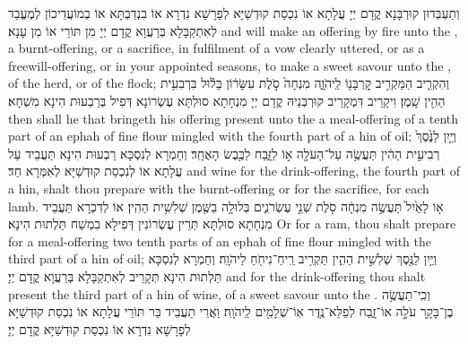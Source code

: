 {וְתַעְבְּדוּן קוּרְבָּנָא קֳדָם יְיָ עֲלָתָא אוֹ נִכְסַת קוּדְשַׁיָּא לְפָרָשָׁא נִדְרָא אוֹ בִנְדַבְתָּא אוֹ בְמוֹעֲדֵיכוֹן לְמֶעֱבַד לְאִתְקַבָּלָא בְּרַעֲוָא קֳדָם יְיָ מִן תּוֹרֵי אוֹ מִן עָנָא׃}
{and will make an offering by fire unto the \lord, a burnt-offering, or a sacrifice, in fulfilment of a vow clearly uttered, or as a freewill-offering, or in your appointed seasons, to make a sweet savour unto the \lord, of the herd, or of the flock;}{}
{וְהִקְרִ֛יב הַמַּקְרִ֥יב קׇרְבָּנ֖וֹ לַֽיהֹוָ֑ה מִנְחָה֙ סֹ֣לֶת עִשָּׂר֔וֹן בָּל֕וּל בִּרְבִעִ֥ית הַהִ֖ין שָֽׁמֶן׃
}
{וִיקָרֵיב דִּמְקָרֵיב קוּרְבְּנֵיהּ קֳדָם יְיָ מִנְחָתָא סוּלְתָּא עֶשְׂרוֹנָא דְּפִיל בְּרַבְעוּת הִינָא מִשְׁחָא׃}
{then shall he that bringeth his offering present unto the \lord\space a meal-offering of a tenth part of an ephah of fine flour mingled with the fourth part of a hin of oil;}{}
{וְיַ֤יִן לַנֶּ֙סֶךְ֙ רְבִיעִ֣ית הַהִ֔ין תַּעֲשֶׂ֥ה עַל־הָעֹלָ֖ה א֣וֹ לַזָּ֑בַח לַכֶּ֖בֶשׂ הָאֶחָֽד׃
}
{וְחַמְרָא לְנִסְכָּא רַבְעוּת הִינָא תַּעֲבֵיד עַל עֲלָתָא אוֹ לְנִכְסַת קוּדְשַׁיָּא לְאִמְּרָא חַד׃}
{and wine for the drink-offering, the fourth part of a hin, shalt thou prepare with the burnt-offering or for the sacrifice, for each lamb.}{}
{א֤וֹ לָאַ֙יִל֙ תַּעֲשֶׂ֣ה מִנְחָ֔ה סֹ֖לֶת שְׁנֵ֣י עֶשְׂרֹנִ֑ים בְּלוּלָ֥ה בַשֶּׁ֖מֶן שְׁלִשִׁ֥ית הַהִֽין׃
}
{אוֹ לְדִכְרָא תַּעֲבֵיד מִנְחָתָא סוּלְתָּא תְּרֵין עֶשְׂרוֹנִין דְּפִילָא בִמְשַׁח תַּלְתוּת הִינָא׃}
{Or for a ram, thou shalt prepare for a meal-offering two tenth parts of an ephah of fine flour mingled with the third part of a hin of oil;}{}
{וְיַ֥יִן לַנֶּ֖סֶךְ שְׁלִשִׁ֣ית הַהִ֑ין תַּקְרִ֥יב רֵֽיחַ־נִיחֹ֖חַ לַיהֹוָֽה׃}
{וְחַמְרָא לְנִסְכָּא תַּלְתוּת הִינָא תְּקָרֵיב לְאִתְקַבָּלָא בְּרַעֲוָא קֳדָם יְיָ׃}
{and for the drink-offering thou shalt present the third part of a hin of wine, of a sweet savour unto the \lord.}{}
{וְכִֽי־תַעֲשֶׂ֥ה בֶן־בָּקָ֖ר עֹלָ֣ה אוֹ־זָ֑בַח לְפַלֵּא־נֶ֥דֶר אֽוֹ־שְׁלָמִ֖ים לַֽיהֹוָֽה׃}
{וַאֲרֵי תַעֲבֵיד בַּר תּוֹרֵי עֲלָתָא אוֹ נִכְסַת קוּדְשַׁיָּא לְפָרָשָׁא נִדְרָא אוֹ נִכְסַת קוּדְשַׁיָּא קֳדָם יְיָ׃}
